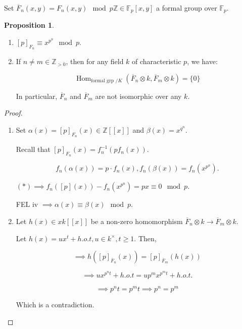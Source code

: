 \documentclass{article}
\theoremstyle{definition}
\numberwithin{theorem}{subsection}
\newtheorem{proposition}[theorem]{Proposition}
\begin{document}
    Set \(\overline{F}_n(x,y) = F_n(x,y) \mod p \mathbb{Z} \in \mathbb{F}_p[x,y]\) a formal group over \(\mathbb{F}_p\).
    
    \begin{proposition}
        \begin{enumerate}[label=\roman*)]
            \item \([p]_{F_n} \equiv x^{p^n} \mod p\).
            \item If \(n\neq m \in \mathbb{Z}_{>0}\), then for any field \(k\) of characteristic \(p\), we have:
            
            \[
                \operatorname{Hom}_{\text{formal grp } / K}  \left( \overline{F}_n \otimes k, \overline{F}_m \otimes k \right) = \{ 0 \} 
            \]

            In particular, \(\overline{F}_n\) and \(\overline{F}_m\) are not isomorphic over any \(k\).
        \end{enumerate} 
    \end{proposition}

    \begin{proof}
        \begin{enumerate}[label=\roman*)]
            \item Set \(\alpha(x) = [p]_{F_n}(x) \in \mathbb{Z} [[x]]\) and \(\beta(x) = x^{q^n}\).
            
            Recall that \([p]_{F_n}(x) = f_n ^{-1} (p f_n (x))\).

            \[
                f_n(\alpha(x)) = p \cdot f_n(x), f_n(\beta(x)) = f_n(x^{p^n}).
            \]

            \((\ast) \implies f_n([p](x)) - f_n(x^{p^n}) = px \equiv 0\mod p\).
            
            FEL iv \(\implies \alpha(x) \equiv \beta(x) \mod p\).

            \item Let \(h(x) \in x k[[x]]\) be a non-zero homomorphism \(\overline{F}_n \otimes k \to \overline{F}_m \otimes k\).
            
            Let \(h(x) = ux^t + h.o.t, u\in k^\times , t \geq 1\). Then,

            \[
                \implies h \left( [p]_{\overline{F}_n}(x) \right) = [p]_{\overline{F}_m}(h(x)) 
            \]

            \[
                \implies u x^{p^n t} + h.o.t = u p^m x^{p^m t} + h.o.t.
            \]

            \[
                \implies  p^{n} t = p^m t \implies p^n = p^m
            \]

            Which is a contradiction.

        \end{enumerate} 
    \end{proof}
\end{document}
